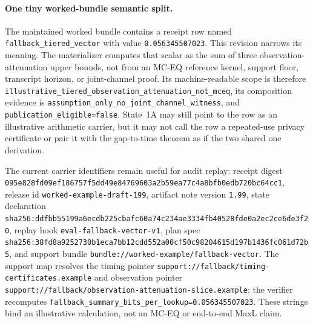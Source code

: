 \documentclass[11pt]{article}
\theoremstyle{definition}
\theoremstyle{remark}
\begin{document}
\paragraph{One tiny worked-bundle semantic split.}
The maintained worked bundle contains a receipt row named \nolinkurl{fallback\_tiered\_vector} with value \nolinkurl{0.056345507023}.  This revision narrows its meaning.  The materializer computes that scalar as the sum of three observation-attenuation upper bounds, not from an MC-EQ reference kernel, support floor, transcript horizon, or joint-channel proof.  Its machine-readable scope is therefore \nolinkurl{illustrative\_tiered\_observation\_attenuation\_not\_mceq}, its composition evidence is \nolinkurl{assumption\_only\_no\_joint\_channel\_witness}, and \nolinkurl{publication\_eligible=false}.  State~1A may still point to the row as an illustrative arithmetic carrier, but it may not call the row a repeated-use privacy certificate or pair it with the gap-to-time theorem as if the two shared one derivation.

The current carrier identifiers remain useful for audit replay: receipt digest \nolinkurl{095e828fd09ef186757f5dd49e84769603a2b59ea77c4a8bfb0edb720bc64cc1}, release id \nolinkurl{worked-example-draft-199}, artifact note version \nolinkurl{1.99}, state declaration \nolinkurl{sha256:ddfbb55199a6ecdb225cbafc60a74c234ae3334fb40528fde0a2ec2ce6de3f20}, replay hook \nolinkurl{eval-fallback-vector-v1}, plan spec \nolinkurl{sha256:38fd8a9252730b1eca7bb12cdd552a00cf50c98204615d197b1436fc061d72b5}, and support bundle \nolinkurl{bundle://worked-example/fallback-vector}.  The support map resolves the timing pointer \nolinkurl{support://fallback/timing-certificates.example} and observation pointer \nolinkurl{support://fallback/observation-attenuation-slice.example}; the verifier recomputes \nolinkurl{fallback_summary_bits_per_lookup=0.056345507023}.  These strings bind an illustrative calculation, not an MC-EQ or end-to-end MaxL claim.\cite{series:workedexample,series:bossfightA,series:evalnotary,series:seriesspines}
\end{document}
